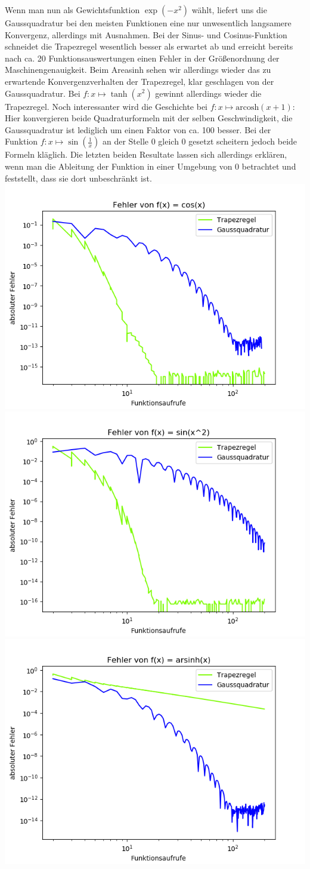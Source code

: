 Wenn man nun als Gewichtsfunktion $\exp(-x^{2})$ wählt, liefert uns die Gaussquadratur bei den meisten Funktionen eine nur unwesentlich langsamere Konvergenz, allerdings mit Ausnahmen.
Bei der Sinus- und Cosinus-Funktion schneidet die Trapezregel wesentlich besser als erwartet ab und erreicht bereits nach ca. 20 Funktionsauswertungen einen Fehler in der Größenordnung der Maschinengenauigkeit. Beim Areasinh sehen wir allerdings wieder das zu erwartende Konvergenzverhalten der Trapezregel, klar geschlagen von der Gaussquadratur. Bei $f: x \mapsto \tanh(x^2)$ gewinnt allerdings wieder die Trapezregel. Noch interessanter wird die Geschichte bei $f: x \mapsto \text{arcosh}(x+1)$: Hier konvergieren beide Quadraturformeln mit der selben Geschwindigkeit, die Gaussquadratur ist lediglich um einen Faktor von ca. 100 besser. Bei der Funktion $f: x \mapsto \sin(\frac{1}{x})$ an der Stelle 0 gleich 0 gesetzt scheitern jedoch beide Formeln kläglich. Die letzten beiden Resultate lassen sich allerdings erklären, wenn man die Ableitung der Funktion in einer Umgebung von 0 betrachtet und feststellt, dass sie dort unbeschränkt ist.
\FloatBarrier
\includegraphics[width=0.5\linewidth]{gauss-trapez(-x^2),cos.png}
\includegraphics[width=0.5\linewidth]{gauss-trapez(-x^2),sin(x^2).png}
\includegraphics[width=0.5\linewidth]{gauss-trapez-arsinh.png}
